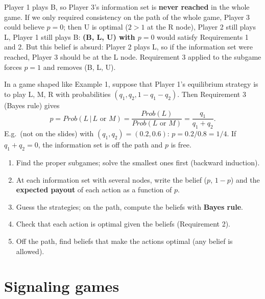 \documentclass[11pt,a4paper,openany]{book}
\begin{document}
\begin{warnbox}[title={Why ``or of any of its subgames'' in Requirement 3 (not on the slides)}]
Player 1 plays B, so Player 3's information set is \textbf{never reached} in the whole game.
If we only required consistency on the path of the whole game, Player 3 could believe
$p = 0$; then U is optimal ($2 > 1$ at the R node), Player 2 still plays L, Player 1 still
plays B: \textbf{(B, L, U) with $p = 0$} would satisfy Requirements 1 and 2. But this belief
is absurd: Player 2 plays L, so if the information set were reached, Player 3 should be at
the L node. Requirement 3 applied to the subgame forces $p = 1$ and removes (B, L, U).
\end{warnbox}


\begin{exbox}[title={Example 3: beliefs with mixed strategies}]
In a game shaped like Example 1, suppose that Player 1's equilibrium strategy is to play
L, M, R with probabilities $(q_1, q_2, 1 - q_1 - q_2)$. Then Requirement 3 (Bayes rule) gives
\[
p = Prob(L \,|\, L \text{ or } M) = \frac{Prob(L)}{Prob(L \text{ or } M)}
  = \frac{q_1}{q_1 + q_2}.
\]
E.g.\ (not on the slides) with $(q_1, q_2) = (0.2, 0.6)$: $p = 0.2/0.8 = 1/4$. If
$q_1 + q_2 = 0$, the information set is off the path and $p$ is free.
\end{exbox}


\begin{algbox}[title={How to find a PBE (method, not on the slides)}]
\begin{enumerate}
  \item Find the proper subgames; solve the smallest ones first (backward induction).
  \item At each information set with several nodes, write the belief ($p$, $1-p$) and the
        \textbf{expected payout} of each action as a function of $p$.
  \item Guess the strategies; on the path, compute the beliefs with \textbf{Bayes rule}.
  \item Check that each action is optimal given the beliefs (Requirement 2).
  \item Off the path, find beliefs that make the actions optimal (any belief is allowed).
\end{enumerate}
\end{algbox}


\section{Signaling games}
\end{document}
